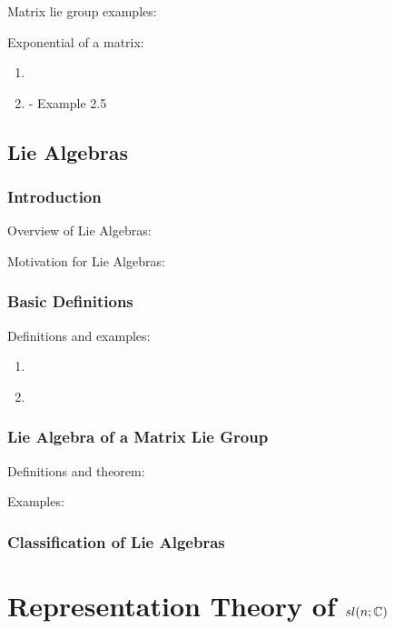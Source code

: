 \documentclass[11pt, a4paper, oneside]{article}
\theoremstyle{plain}
\theoremstyle{definition}
\theoremstyle{example}
\begin{document}
Matrix lie group examples: \cite[Section 1.2]{hall} 

Exponential of a matrix:
\begin{enumerate}
\item \cite[Section 2.1]{hall}

\item \cite[Section 2.2]{hall} - Example 2.5

\end{enumerate} 

\subsection{Lie Algebras}

\subsubsection{Introduction}

Overview of Lie Algebras: \cite{liealgebrawiki}

Motivation for Lie Algebras: \cite[Section 8.1]{fulton}

\subsubsection{Basic Definitions}

Definitions and examples:
\begin{enumerate}
\item \cite[Section 8.1]{fulton}

\item \cite[Section 3.1]{hall}
\end{enumerate}

\subsubsection{Lie Algebra of a Matrix Lie Group}

Definitions and theorem: \cite[Section 3.3]{hall}

Examples: \cite[Section 3.4]{hall}

\subsubsection{Classification of Lie Algebras}

\cite[Chapter 9]{fulton}

\section{Representation Theory of $sl(n; \mathbb{C})$}
\end{document}
